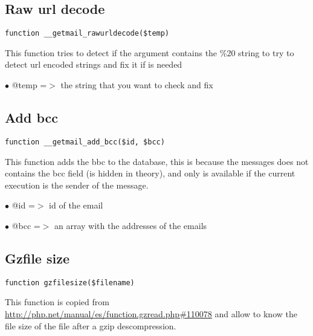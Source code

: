 \documentclass[a4paper]{book}
\def\htmladdnormallink#1#2{\href{#2}{#1}}
\begin{document}
\hypertarget{toc551}{}
\subsection{Raw url decode}

\begin{lstlisting}
function __getmail_rawurldecode($temp)
\end{lstlisting}

This function tries to detect if the argument contains the \%20 string
to try to detect url encoded strings and fix it if is needed

\begin{compactitem}
\item[\color{myblue}$\bullet$] @temp =$>$ the string that you want to check and fix
\end{compactitem}

\hypertarget{toc552}{}
\subsection{Add bcc}

\begin{lstlisting}
function __getmail_add_bcc($id, $bcc)
\end{lstlisting}

This function adds the bbc to the database, this is because the messages
does not contains the bcc field (is hidden in theory), and only is available
if the current execution is the sender of the message.

\begin{compactitem}
\item[\color{myblue}$\bullet$] @id  =$>$ id of the email
\item[\color{myblue}$\bullet$] @bcc =$>$ an array with the addresses of the emails
\end{compactitem}

\hypertarget{toc553}{}
\subsection{Gzfile size}

\begin{lstlisting}
function gzfilesize($filename)
\end{lstlisting}

This function is copied from \htmladdnormallink{http://php.net/manual/es/function.gzread.php\#110078}{http://php.net/manual/es/function.gzread.php\#110078}
and allow to know the file size of the file after a gzip descompression.
\end{document}
